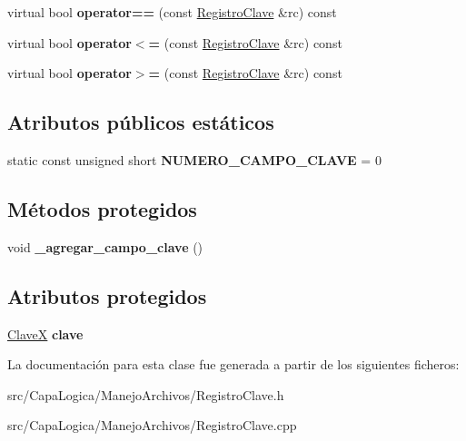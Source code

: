 \begin{DoxyCompactItemize}
\item 
\hypertarget{class_registro_clave_af9bde2797b5929d9fb0476feb8d48f42}{virtual bool {\bfseries operator==} (const \hyperlink{class_registro_clave}{\-Registro\-Clave} \&rc) const }\label{class_registro_clave_af9bde2797b5929d9fb0476feb8d48f42}

\item 
\hypertarget{class_registro_clave_aeef96d144ee9f0d33ddb93dea1b0af42}{virtual bool {\bfseries operator$<$=} (const \hyperlink{class_registro_clave}{\-Registro\-Clave} \&rc) const }\label{class_registro_clave_aeef96d144ee9f0d33ddb93dea1b0af42}

\item 
\hypertarget{class_registro_clave_ad13a87e872590ae504524e8d63ff1497}{virtual bool {\bfseries operator$>$=} (const \hyperlink{class_registro_clave}{\-Registro\-Clave} \&rc) const }\label{class_registro_clave_ad13a87e872590ae504524e8d63ff1497}

\end{DoxyCompactItemize}
\subsection*{\-Atributos públicos estáticos}
\begin{DoxyCompactItemize}
\item 
\hypertarget{class_registro_clave_ad970e1aa76c7025c75a8552db7c7d8e4}{static const unsigned short {\bfseries \-N\-U\-M\-E\-R\-O\-\_\-\-C\-A\-M\-P\-O\-\_\-\-C\-L\-A\-V\-E} = 0}\label{class_registro_clave_ad970e1aa76c7025c75a8552db7c7d8e4}

\end{DoxyCompactItemize}
\subsection*{\-Métodos protegidos}
\begin{DoxyCompactItemize}
\item 
\hypertarget{class_registro_clave_a8ed9a4be8f2e55464fb19f1890929ae7}{void {\bfseries \-\_\-agregar\-\_\-campo\-\_\-clave} ()}\label{class_registro_clave_a8ed9a4be8f2e55464fb19f1890929ae7}

\end{DoxyCompactItemize}
\subsection*{\-Atributos protegidos}
\begin{DoxyCompactItemize}
\item 
\hypertarget{class_registro_clave_aebabf42f1dc2a6a01845e45785ab7a50}{\hyperlink{class_clave_x}{\-Clave\-X} {\bfseries clave}}\label{class_registro_clave_aebabf42f1dc2a6a01845e45785ab7a50}

\end{DoxyCompactItemize}


\-La documentación para esta clase fue generada a partir de los siguientes ficheros\-:\begin{DoxyCompactItemize}
\item 
src/\-Capa\-Logica/\-Manejo\-Archivos/\-Registro\-Clave.\-h\item 
src/\-Capa\-Logica/\-Manejo\-Archivos/\-Registro\-Clave.\-cpp\end{DoxyCompactItemize}
